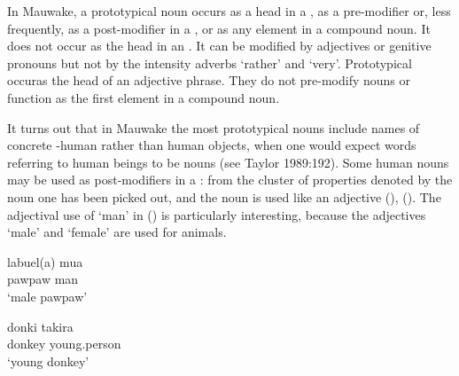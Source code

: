 In Mauwake, a prototypical noun occurs as a head in a , as a pre-modifier or, less frequently, as a post-modifier in a , or as any element in a compound noun. It does not occur as the head in an . It can be modified by adjectives or genitive pronouns but not by the intensity adverbs  `rather' and  `very'. Prototypical \textstyleEmphasizedWords{ }occur\textstyleEmphasizedWords{ }as the head of an adjective phrase. They do not pre-modify nouns or function as the first element in a compound noun.

It turns out that in Mauwake the most prototypical nouns include names of concrete -human rather than human objects, when one would expect words referring to human beings to be nouns  (see Taylor 1989:192). Some human nouns may be used as post-modifiers in a : from the cluster of properties denoted by the noun one has been picked out, and the noun is used like an adjective (), (). The adjectival use of  `man' in () is particularly interesting, because the adjectives  `male' and  `female' are used for animals.

\ea%
\label{ex:x23}
\gll labuel(a) mua \\
pawpaw man\\
\glt`male pawpaw'
\z

\ea%
\label{ex:x24}
\gll donki takira \\
donkey young.person\\
\glt`young donkey'
\z

